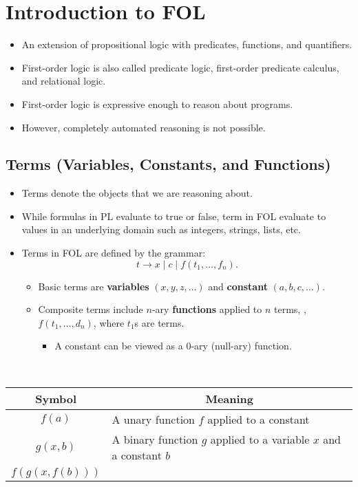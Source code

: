
\section{Introduction to FOL}
\begin{itemize}
	\item An extension of propositional logic with predicates, functions, and quantifiers.
	\item First-order logic is also called predicate logic, first-order predicate calculus, and relational logic.
	\item First-order logic is expressive enough to reason about programs.
	\item However, completely automated reasoning is not possible.
\end{itemize}

\subsection{Terms (Variables, Constants, and Functions)}
\begin{itemize}
	\item Terms denote the objects that we are reasoning about.
	\item While formulas in \textsf{PL} evaluate to true or false, term in \textsf{FOL} evaluate to values in an underlying domain such as integers, strings, lists, etc.
	\item Terms in \textsf{FOL} are defined by the grammar: \[
	t\to x\mid c\mid f(t_1,\dots, f_n).
	\] \begin{itemize}
		\item Basic terms are \textbf{variables} $(x,y,z,\dots)$ and \textbf{constant} $(a,b,c,\dots)$.
		\item Composite terms include $n$-ary \textbf{functions} applied to $n$ terms, \ie, $f(t_1,\dots,d_n)$, where $t_1$s are terms.
		\begin{itemize}
			\item A constant can be viewed as a $0$-ary (null-ary) function.
		\end{itemize}
	\end{itemize}
\end{itemize}
\begin{example}
\ \begin{table}[h!]\centering\begin{tabular}{c|l}
	\hline
	Symbol & \multicolumn{1}{c}{Meaning} \\ \hline
	$f(a)$ & A unary function $f$ applied to a constant \\
	$g(x,b)$ & A binary function $g$ applied to a variable $x$ and a constant $b$ \\
	$f(g(x,f(b)))$ &  \\ \hline
\end{tabular}
\end{table}
\end{example}

